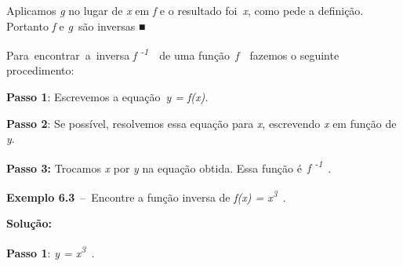 \documentclass[12pt]{article}
\begin{document}
\begin{enumerate}[label*={\fontsize{14pt}{14pt}\selectfont \textbf{\arabic*.}}]
\begin{adjustwidth}{0.49in}{0.0in}
\begin{justify}
Aplicamos \textit{g} no lugar de \textit{x} em \textit{f} e o resultado foi\  \textit{x}, como pede a definição. Portanto \textit{f} e \textit{g\  }são inversas ■
\end{justify}\par

\end{adjustwidth}


\vspace{\baselineskip}
\begin{justify}
Para\ encontrar\ a\ inversa    \textit{f \textsuperscript{-1}}\ \  de uma função\  \textit{f}\ \  fazemos o seguinte procedimento:
\end{justify}\par

\begin{justify}
\textbf{Passo 1}: Escrevemos a equação\  \textit{y = f(x).}
\end{justify}\par

\begin{justify}
\textbf{Passo 2}: Se possível, resolvemos essa equação para \textit{x}, escrevendo \textit{x} em função de \textit{y}.
\end{justify}\par

\begin{justify}
\textbf{Passo 3: }Trocamos \textit{x} por \textit{y} na equação obtida. Essa função é\  \textit{f \textsuperscript{-1}}\ .  
\end{justify}\par


\vspace{\baselineskip}
\begin{justify}
\textbf{Exemplo 6.3}\ –\ Encontre a função inversa de   \textit{f(x) = x\textsuperscript{3}}\  . 
\end{justify}\par

\begin{justify}
\textbf{Solução:  }
\end{justify}\par

\begin{justify}
\textbf{Passo 1}: \textit{y = x\textsuperscript{3}}\  \textit{.}
\end{justify}\par


\end{enumerate}
\end{document}
